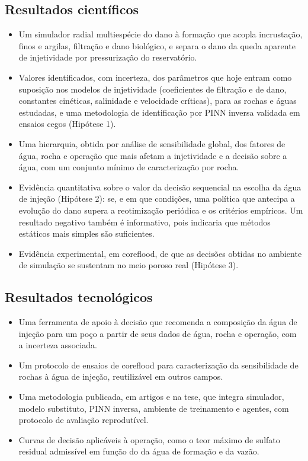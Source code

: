 \documentclass[10pt,a4paper]{article}
\begin{document}
\subsection{Resultados científicos}
\begin{itemize}
  \item Um simulador radial multiespécie do dano à formação que acopla incrustação, finos e
        argilas, filtração e dano biológico, e separa o dano da queda aparente de
        injetividade por pressurização do reservatório.
  \item Valores identificados, com incerteza, dos parâmetros que hoje entram como
        suposição nos modelos de injetividade (coeficientes de filtração e de dano,
        constantes cinéticas, salinidade e velocidade críticas), para as rochas e águas
        estudadas, e uma metodologia de identificação por PINN inversa validada em
        ensaios cegos (Hipótese 1).
  \item Uma hierarquia, obtida por análise de sensibilidade global, dos fatores de água,
        rocha e operação que mais afetam a injetividade e a decisão sobre a água, com um
        conjunto mínimo de caracterização por rocha.
  \item Evidência quantitativa sobre o valor da decisão sequencial na escolha da água de
        injeção (Hipótese 2): se, e em que condições, uma política que antecipa a evolução do dano
        supera a reotimização periódica e os critérios empíricos. Um resultado negativo
        também é informativo, pois indicaria que métodos estáticos mais simples são
        suficientes.
  \item Evidência experimental, em coreflood, de que as decisões obtidas no ambiente de
        simulação se sustentam no meio poroso real (Hipótese 3).
\end{itemize}

\subsection{Resultados tecnológicos}
\begin{itemize}
  \item Uma ferramenta de apoio à decisão que recomenda a composição da água de injeção
        para um poço a partir de seus dados de água, rocha e
        operação, com a incerteza associada.
  \item Um protocolo de ensaios de coreflood para caracterização da sensibilidade de rochas
        à água de injeção, reutilizável em outros campos.
  \item Uma metodologia publicada, em artigos e na tese, que integra simulador, modelo
        substituto, PINN inversa, ambiente de treinamento e agentes, com protocolo de
        avaliação reprodutível.
  \item Curvas de decisão aplicáveis à operação, como o teor máximo de sulfato residual
        admissível em função do  da água de formação e da vazão.
\end{itemize}
\end{document}
